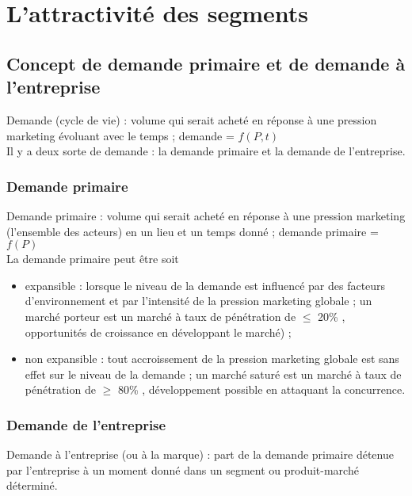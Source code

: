 
\chapter{L'attractivité des segments}
	
	\section{Concept de demande primaire et de demande à l'entreprise}
		
	
	Demande (cycle de vie) : volume qui serait acheté en réponse à une pression marketing évoluant avec le temps ; demande = $f(P, t)$ \\
	
	Il y a deux sorte de demande : la demande primaire et la demande de l'entreprise.
		
		\subsection{Demande primaire}
		Demande primaire : volume qui serait acheté en réponse à une pression marketing (l'ensemble des acteurs) en un lieu et un temps donné ; demande primaire = $f(P)$ \\
		
		La demande primaire peut être soit 
		\begin{itemize}
			\item expansible : lorsque le niveau de la demande est influencé par des facteurs d'environnement et par l'intensité de la pression marketing globale ; un marché porteur est un marché à taux de pénétration de $\leq$ 20\% , opportunités de croissance en développant le marché) ;
			
			\item non expansible : tout accroissement de la pression marketing globale est sans effet sur le niveau de la demande ; un marché saturé est un marché à taux de pénétration de $\geq$ 80\% , développement possible en attaquant la concurrence.
		\end{itemize}		
					
		
		
		\subsection{Demande de l'entreprise}
		
		Demande à l'entreprise (ou à la marque) : part de la demande primaire détenue par l'entreprise à un moment donné dans un segment ou produit-marché déterminé.
		
